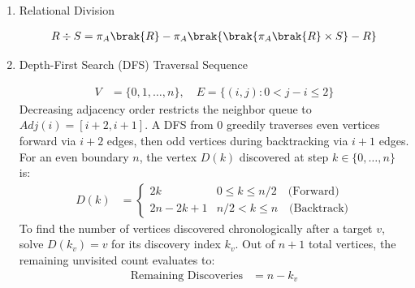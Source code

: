 \begin{enumerate}[label=\thesubsection.\arabic*, ref=\thesubsection.\theenumi]
	\item Relational Division
	
	\begin{align}
		R \div S = \pi_A\brak{R} - \pi_A\brak{\brak{\pi_A\brak{R} \times S} - R} \label{eq:DA2025-rel_div}
	\end{align}
	\item Depth-First Search (DFS) Traversal Sequence
	
	\begin{align}
		V &= \{0, 1, \dots, n\}, \quad E = \{(i, j) : 0 < j - i \le 2\} \label{eq:DA2025-dfs_graph_def}
	\end{align}
	\solution
	Decreasing adjacency order restricts the neighbor queue to $Adj(i) = [i+2, i+1]$. A DFS from $0$ greedily traverses even vertices forward via $i+2$ edges, then odd vertices during backtracking via $i+1$ edges. For an even boundary $n$, the vertex $D(k)$ discovered at step $k \in \{0, \dots, n\}$ is:
	\begin{align}
		D(k) &= \begin{cases} 2k & 0 \le k \le n/2 \quad \text{(Forward)} \\ 2n - 2k + 1 & n/2 < k \le n \quad \text{(Backtrack)} \end{cases} \label{eq:DA2025-dfs_seq}
	\end{align}
	To find the number of vertices discovered chronologically after a target $v$, solve $D(k_v) = v$ for its discovery index $k_v$. Out of $n+1$ total vertices, the remaining unvisited count evaluates to:
	\begin{align}
		\text{Remaining Discoveries} &= n - k_v \label{eq:DA2025-dfs_remaining}
	\end{align}
	
\end{enumerate}

